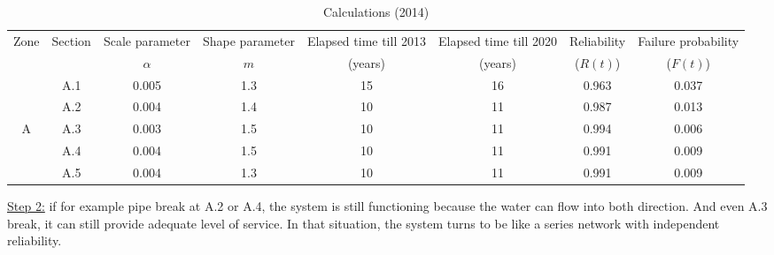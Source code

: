 \begin{table}[h]
\caption{Calculations (2014)}
\begin{tabular}{|l|l|l|l|l|l|l|l|}
\hline
\multicolumn{1}{|c|}{Zone} & \multicolumn{1}{c|}{Section} & \multicolumn{1}{c|}{Scale parameter} & \multicolumn{1}{c|}{Shape parameter} & \multicolumn{1}{c|}{Elapsed time till 2013} & \multicolumn{1}{c|}{Elapsed time till 2020} & \multicolumn{1}{c|}{Reliability} & \multicolumn{1}{c|}{Failure probability} \\ 
\multicolumn{1}{|c|}{} & \multicolumn{1}{c|}{} & \multicolumn{1}{c|}{$\alpha$} & \multicolumn{1}{c|}{$m$} & \multicolumn{1}{c|}{(years)} & \multicolumn{1}{c|}{(years)} & \multicolumn{1}{c|}{($R(t)$)} & \multicolumn{1}{c|}{($F(t)$)} \\ 
\hline
\multicolumn{1}{|c|}{} & \multicolumn{1}{c|}{A.1} & \multicolumn{1}{c|}{0.005} & \multicolumn{1}{c|}{1.3} & \multicolumn{1}{c|}{15} & \multicolumn{1}{c|}{16} & \multicolumn{1}{c|}{0.963} & \multicolumn{1}{c|}{0.037} \\ 
\cline{2-8}
\multicolumn{1}{|c|}{} & \multicolumn{1}{c|}{A.2} & \multicolumn{1}{c|}{0.004} & \multicolumn{1}{c|}{1.4} & \multicolumn{1}{c|}{10} & \multicolumn{1}{c|}{11} & \multicolumn{1}{c|}{0.987} & \multicolumn{1}{c|}{0.013} \\ 
\cline{2-8}
\multicolumn{1}{|c|}{A} & \multicolumn{1}{c|}{A.3} & \multicolumn{1}{c|}{0.003} & \multicolumn{1}{c|}{1.5} & \multicolumn{1}{c|}{10} & \multicolumn{1}{c|}{11} & \multicolumn{1}{c|}{0.994} & \multicolumn{1}{c|}{0.006} \\ 
\cline{2-8}
\multicolumn{1}{|c|}{} & \multicolumn{1}{c|}{A.4} & \multicolumn{1}{c|}{0.004} & \multicolumn{1}{c|}{1.5} & \multicolumn{1}{c|}{10} & \multicolumn{1}{c|}{11} & \multicolumn{1}{c|}{0.991} & \multicolumn{1}{c|}{0.009} \\ 
\cline{2-8}
\multicolumn{1}{|c|}{} & \multicolumn{1}{c|}{A.5} & \multicolumn{1}{c|}{0.004} & \multicolumn{1}{c|}{1.3} & \multicolumn{1}{c|}{10} & \multicolumn{1}{c|}{11} & \multicolumn{1}{c|}{0.991} & \multicolumn{1}{c|}{0.009} \\ 
\hline
\end{tabular}
\label{tbl-reliability-a:12}
\end{table}
\underline{Step 2:} if for example pipe break at A.2 or A.4, the system is still
functioning because the water can flow into both direction. And even A.3 break,
it can still provide adequate level of service. In that situation, the system
turns to be like a series network with independent reliability.


